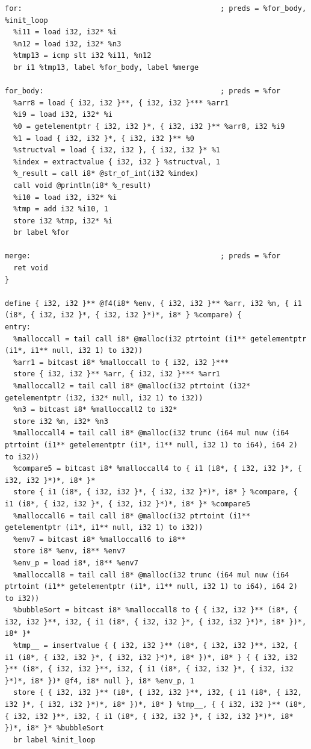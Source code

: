\documentclass[12pt]{article}
\begin{document}
\begin{mdframed}[hidealllines=true,backgroundcolor=green!10]
\begin{lstlisting}
for:                                              ; preds = %for_body, %init_loop
  %i11 = load i32, i32* %i
  %n12 = load i32, i32* %n3
  %tmp13 = icmp slt i32 %i11, %n12
  br i1 %tmp13, label %for_body, label %merge

for_body:                                         ; preds = %for
  %arr8 = load { i32, i32 }**, { i32, i32 }*** %arr1
  %i9 = load i32, i32* %i
  %0 = getelementptr { i32, i32 }*, { i32, i32 }** %arr8, i32 %i9
  %1 = load { i32, i32 }*, { i32, i32 }** %0
  %structval = load { i32, i32 }, { i32, i32 }* %1
  %index = extractvalue { i32, i32 } %structval, 1
  %_result = call i8* @str_of_int(i32 %index)
  call void @println(i8* %_result)
  %i10 = load i32, i32* %i
  %tmp = add i32 %i10, 1
  store i32 %tmp, i32* %i
  br label %for

merge:                                            ; preds = %for
  ret void
}

define { i32, i32 }** @f4(i8* %env, { i32, i32 }** %arr, i32 %n, { i1 (i8*, { i32, i32 }*, { i32, i32 }*)*, i8* } %compare) {
entry:
  %malloccall = tail call i8* @malloc(i32 ptrtoint (i1** getelementptr (i1*, i1** null, i32 1) to i32))
  %arr1 = bitcast i8* %malloccall to { i32, i32 }***
  store { i32, i32 }** %arr, { i32, i32 }*** %arr1
  %malloccall2 = tail call i8* @malloc(i32 ptrtoint (i32* getelementptr (i32, i32* null, i32 1) to i32))
  %n3 = bitcast i8* %malloccall2 to i32*
  store i32 %n, i32* %n3
  %malloccall4 = tail call i8* @malloc(i32 trunc (i64 mul nuw (i64 ptrtoint (i1** getelementptr (i1*, i1** null, i32 1) to i64), i64 2) to i32))
  %compare5 = bitcast i8* %malloccall4 to { i1 (i8*, { i32, i32 }*, { i32, i32 }*)*, i8* }*
  store { i1 (i8*, { i32, i32 }*, { i32, i32 }*)*, i8* } %compare, { i1 (i8*, { i32, i32 }*, { i32, i32 }*)*, i8* }* %compare5
  %malloccall6 = tail call i8* @malloc(i32 ptrtoint (i1** getelementptr (i1*, i1** null, i32 1) to i32))
  %env7 = bitcast i8* %malloccall6 to i8**
  store i8* %env, i8** %env7
  %env_p = load i8*, i8** %env7
  %malloccall8 = tail call i8* @malloc(i32 trunc (i64 mul nuw (i64 ptrtoint (i1** getelementptr (i1*, i1** null, i32 1) to i64), i64 2) to i32))
  %bubbleSort = bitcast i8* %malloccall8 to { { i32, i32 }** (i8*, { i32, i32 }**, i32, { i1 (i8*, { i32, i32 }*, { i32, i32 }*)*, i8* })*, i8* }*
  %tmp__ = insertvalue { { i32, i32 }** (i8*, { i32, i32 }**, i32, { i1 (i8*, { i32, i32 }*, { i32, i32 }*)*, i8* })*, i8* } { { i32, i32 }** (i8*, { i32, i32 }**, i32, { i1 (i8*, { i32, i32 }*, { i32, i32 }*)*, i8* })* @f4, i8* null }, i8* %env_p, 1
  store { { i32, i32 }** (i8*, { i32, i32 }**, i32, { i1 (i8*, { i32, i32 }*, { i32, i32 }*)*, i8* })*, i8* } %tmp__, { { i32, i32 }** (i8*, { i32, i32 }**, i32, { i1 (i8*, { i32, i32 }*, { i32, i32 }*)*, i8* })*, i8* }* %bubbleSort
  br label %init_loop


\end{lstlisting}
\end{mdframed}
\end{document}
